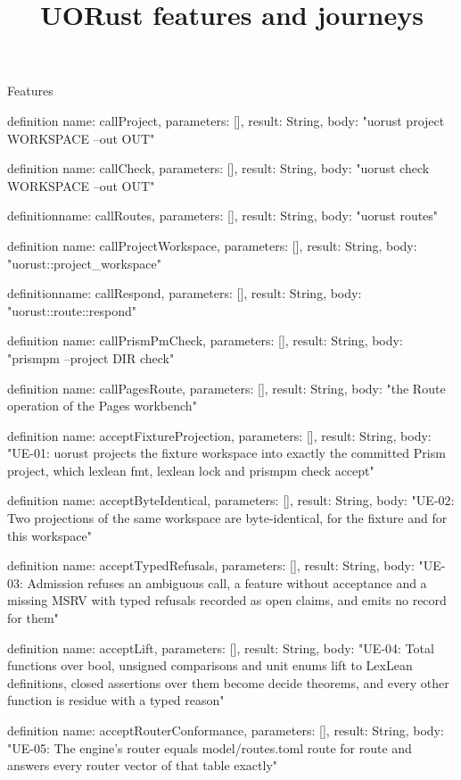 \begin{lexlean}{Features}
\title{UORust features and journeys}
\begin{semanticmodule}
definition{
  name: callProject,
  parameters: [],
  result: String,
  body: "uorust project WORKSPACE --out OUT"
}

definition{
  name: callCheck,
  parameters: [],
  result: String,
  body: "uorust check WORKSPACE --out OUT"
}

definition{name: callRoutes, parameters: [], result: String, body: "uorust routes"}

definition{
  name: callProjectWorkspace,
  parameters: [],
  result: String,
  body: "uorust::project_workspace"
}

definition{name: callRespond, parameters: [], result: String, body: "uorust::route::respond"}

definition{
  name: callPrismPmCheck,
  parameters: [],
  result: String,
  body: "prismpm --project DIR check"
}

definition{
  name: callPagesRoute,
  parameters: [],
  result: String,
  body: "the Route operation of the Pages workbench"
}

definition{
  name: acceptFixtureProjection,
  parameters: [],
  result: String,
  body: "UE-01: uorust projects the fixture workspace into exactly the committed Prism project, which lexlean fmt, lexlean lock and prismpm check accept"
}

definition{
  name: acceptByteIdentical,
  parameters: [],
  result: String,
  body: "UE-02: Two projections of the same workspace are byte-identical, for the fixture and for this workspace"
}

definition{
  name: acceptTypedRefusals,
  parameters: [],
  result: String,
  body: "UE-03: Admission refuses an ambiguous call, a feature without acceptance and a missing MSRV with typed refusals recorded as open claims, and emits no record for them"
}

definition{
  name: acceptLift,
  parameters: [],
  result: String,
  body: "UE-04: Total functions over bool, unsigned comparisons and unit enums lift to LexLean definitions, closed assertions over them become decide theorems, and every other function is residue with a typed reason"
}

definition{
  name: acceptRouterConformance,
  parameters: [],
  result: String,
  body: "UE-05: The engine's router equals model/routes.toml route for route and answers every router vector of that table exactly"
}


\end{semanticmodule}
\end{lexlean}

